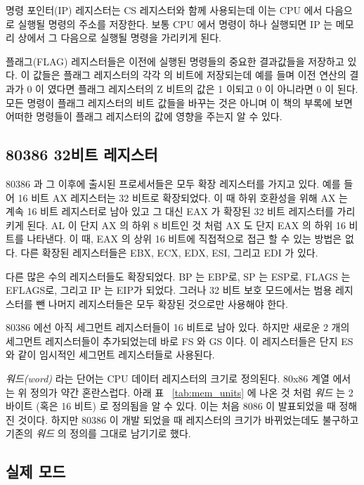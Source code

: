 명령 포인터(IP)  레지스터는 CS 레지스터와 함께 사용되는데 이는 CPU 에서 다음으로 실행될 명령의 주소를 저장한다. 보통 CPU
에서 명령이 하나 실행되면 IP 는 메모리 상에서 그 다음으로 실행될 명령을 가리키게 된다. 

플래그(FLAG)  레지스터들은 이전에 실행된 명령들의 중요한 결과값들을 저장하고 있다. 이 값들은 플래그 레지스터의 각각
의 비트에 저장되는데 예를 들며 이전 연산의 결과가 0 이 였다면 플래그 레지스터의 Z 비트의 값은 1 이되고 0 이 아니라면 0 이 된다. 
모든 명령이 플래그 레지스터의 비트 값들을 바꾸는 것은 아니며 이 책의 부록에 보면 어떠한 명령들이 플래그 레지스터의 값에 영향을 주는지 알 수 있다.

\subsection{80386 32비트 레지스터}

80386 과 그 이후에 출시된 프로세서들은 모두 확장 레지스터를 가지고 있다. 예를 들어 16 비트 AX 레지스터는 32 비트로 확장되었다. 이 때
하위 호환성을 위해 AX 는 계속 16 비트 레지스터로 남아 있고 그 대신 EAX 가 확장된 32 비트 레지스터를 가리키게 된다. AL 이 단지 AX 의 하위
8 비트인 것 처럼 AX 도 단지 EAX 의 하위 16 비트를 나타낸다. 이 때, EAX 의 상위 16 비트에 직접적으로 접근 할 수 있는 방법은 없다. 다른
확장된 레지스터들은 EBX, ECX, EDX, ESI, 그리고 EDI 가 있다. 

다른 많은 수의 레지스터들도 확장되었다. BP 는 EBP로, SP 는 ESP로, FLAGS 는 
EFLAGS로, 그리고 IP 는 EIP가 되었다. 그러나 32 비트 보호 모드에서는 범용 레지스터를 뺀 나머지 레지스터들은
모두 확장된 것으로만 사용해야 한다. 

80386 에선 아직 세그먼트 레지스터들이 16 비트로 남아 있다. 하지만 새로운 2 개의 세그먼트 레지스터들이 추가되었는데 바로 FS 와 GS 이다.
 이 레지스터들은 단지 ES 와 같이 임시적인 세그먼트 레지스터들로 사용된다. 

\emph{워드(word)} 라는 단어는 CPU 데이터 레지스터의 크기로 정의된다.  80x86 계열 에서는 위 정의가 약간 혼란스럽다. 
아래 표 ~\ref{tab:mem_units} 에 나온 것 처럼 \emph{워드} 는 2 바이트 (혹은 16 비트) 로 정의됨을 알 수 있다. 이는 처음 8086 이 발표되었을 때
정해진 것이다. 하지만 80386 이 개발 되었을 때 레지스터의 크기가 바뀌었는데도 불구하고 기존의 \emph{워드} 의 정의를 그대로 남기기로 했다.

\subsection{실제 모드}


